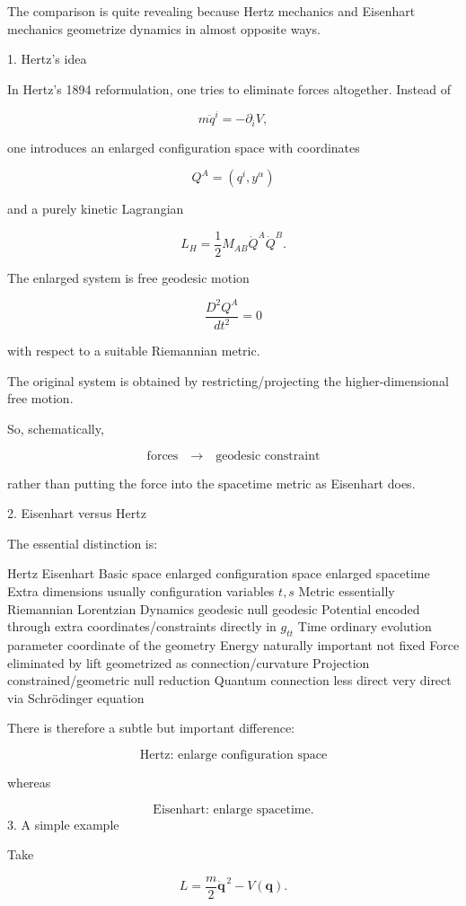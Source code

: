 The comparison is quite revealing because Hertz mechanics and Eisenhart mechanics geometrize dynamics in almost opposite ways.

1. Hertz's idea

In Hertz's 1894 reformulation, one tries to eliminate forces altogether. Instead of

$$ m\ddot q^i=-\partial_i V, $$

one introduces an enlarged configuration space with coordinates

$$ Q^A=(q^i,y^\alpha) $$

and a purely kinetic Lagrangian

$$ L_H=\frac12 M_{AB}\dot Q^A\dot Q^B. $$

The enlarged system is free geodesic motion

$$ \frac{D^2Q^A}{dt^2}=0 $$

with respect to a suitable Riemannian metric.

The original system is obtained by restricting/projecting the higher-dimensional free motion.

So, schematically,

$$ \boxed{ \text{forces} \quad\longrightarrow\quad \text{geodesic constraint} } $$

rather than putting the force into the spacetime metric as Eisenhart does.

2. Eisenhart versus Hertz

The essential distinction is:

	Hertz	Eisenhart
Basic space	enlarged configuration space	enlarged spacetime
Extra dimensions	usually configuration variables	\(t,s\)
Metric	essentially Riemannian	Lorentzian
Dynamics	geodesic	null geodesic
Potential	encoded through extra coordinates/constraints	directly in \(g_{tt}\)
Time	ordinary evolution parameter	coordinate of the geometry
Energy	naturally important	not fixed
Force	eliminated by lift	geometrized as connection/curvature
Projection	constrained/geometric	null reduction
Quantum connection	less direct	very direct via Schrödinger equation

There is therefore a subtle but important difference:

$$ \boxed{\text{Hertz: enlarge configuration space}} $$

whereas

$$ \boxed{\text{Eisenhart: enlarge spacetime}.} $$
3. A simple example

Take

$$ L=\frac{m}{2}\dot{\mathbf q}^{\,2}-V(\mathbf q). $$

